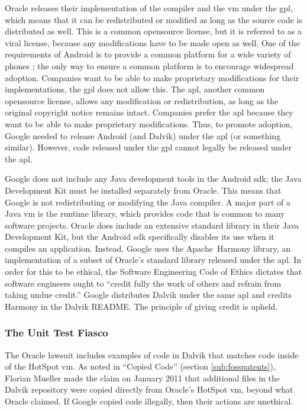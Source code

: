 \documentclass[11pt]{article}
\begin{document}
\begin{multicols}{2}
Oracle releases their implementation of the compiler and the \gls{vm} under the
\gls{gpl}, which means that it can be redistributed or modified as long as the
source code is distributed as well.  This is a common \gls{opensource} license,
but it is referred to as a viral license, because any modifications have to be
made open as well.  One of the requirements of Android is to provide a common
platform for a wide variety of phones \cite{open-handset-alliance-ann}; the only
way to ensure a common platform is to encourage widespread adoption.  Companies
want to be able to make proprietary modifications for their implementations, the
\gls{gpl} does not allow this.  The \gls{apl}, another common \gls{opensource}
license, allows any modification or redistribution, as long as the original
copyright notice remains intact.  Companies prefer the \gls{apl} because they
want to be able to make proprietary modifications.  \cite{why-apache2-license}
Thus, to promote adoption, Google needed to release Android (and Dalvik) under
the \gls{apl} (or something similar).  However, code released under the
\gls{gpl} cannot legally be released under the \gls{apl}.

Google does not include any Java development tools in the Android \gls{sdk}; the
Java Development Kit must be installed separately from Oracle.  This means that
Google is not redistributing or modifying the Java compiler.  A major part of a
Java \gls{vm} is the runtime \gls{library}, which provides code that is common
to many software projects.  Oracle does include an extensive standard
\gls{library} in their Java Development Kit, but the Android \gls{sdk}
specifically disables its use when it compiles an application.  Instead, Google
uses the Apache~Harmony \gls{library}, an implementation of a subset of Oracle's
standard \gls{library} released under the \gls{apl}.  In order for this to be
ethical, the Software Engineering Code of Ethics dictates that software
engineers ought to ``credit fully the work of others and refrain from taking
undue credit.'' \cite[\S 7.03]{secode}  Google distributes Dalvik under the same
\gls{apl} and credits Harmony in the Dalvik README.  \cite{dalvik-readme}  The
principle of giving credit is upheld.

\subsubsection{The Unit Test Fiasco} %
\label{ssub:unittest-fiasco}

The Oracle lawsuit includes examples of code in Dalvik that matches code inside
of the HotSpot \gls{vm}.  As noted in ``Copied Code'' (section
\ref{sub:fosspatents}), Florian Mueller made the claim on January 2011 that
additional files in the Dalvik repository were copied directly from Oracle's
HotSpot \gls{vm}, beyond what Oracle claimed.  If Google copied code illegally,
then their actions are unethical.


\end{multicols}
\end{document}
